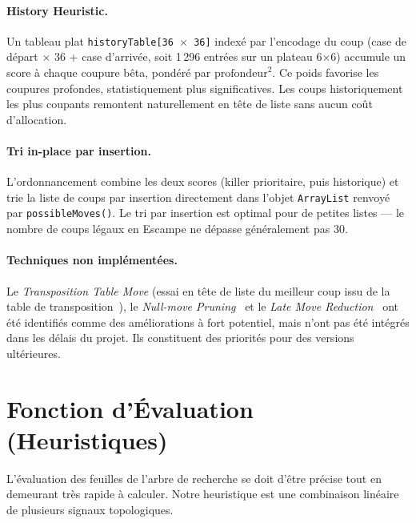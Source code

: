 \documentclass[12pt,a4paper]{article}
\begin{document}
\paragraph{History Heuristic.}
Un tableau plat \texttt{historyTable[36 $\times$ 36]} indexé par l'encodage du coup (case de départ $\times$ 36 + case d'arrivée, soit 1\,296 entrées sur un plateau 6$\times$6) accumule un score à chaque coupure bêta, pondéré par $\text{profondeur}^2$. Ce poids favorise les coupures profondes, statistiquement plus significatives. Les coups historiquement les plus coupants remontent naturellement en tête de liste sans aucun coût d'allocation.

\paragraph{Tri in-place par insertion.}
L'ordonnancement combine les deux scores (killer prioritaire, puis historique) et trie la liste de coups par insertion directement dans l'objet \texttt{ArrayList} renvoyé par \texttt{possibleMoves()}. Le tri par insertion est optimal pour de petites listes — le nombre de coups légaux en Escampe ne dépasse généralement pas 30.

\paragraph{Techniques non implémentées.}
Le \textit{Transposition Table Move} (essai en tête de liste du meilleur coup issu de la table de transposition~\cite{cp_killer}), le \textit{Null-move Pruning}~\cite{cp_nullmove} et le \textit{Late Move Reduction}~\cite{cp_lmr} ont été identifiés comme des améliorations à fort potentiel, mais n'ont pas été intégrés dans les délais du projet. Ils constituent des priorités pour des versions ultérieures.

\section{Fonction d'Évaluation (Heuristiques)}
L'évaluation des feuilles de l'arbre de recherche se doit d'être précise tout en demeurant très rapide à calculer. Notre heuristique est une combinaison linéaire de plusieurs signaux topologiques.
\end{document}
